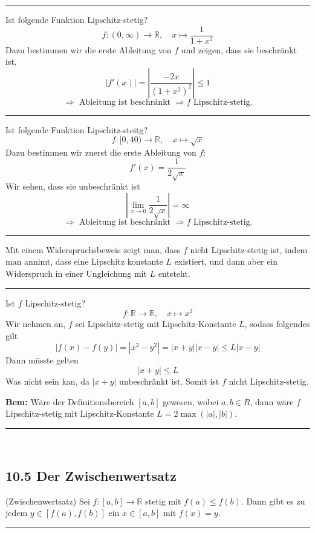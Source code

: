 \documentclass[a4paper,landscape,8pt]{extarticle}
\newcommand{\R}{\mathbb{R}}
\newcommand{\abs}[1]{\left\lvert #1 \right\rvert}
\newcommand{\sep}{\vspace{5pt}\noindent\hrule\vspace{5pt}}
\newcommand{\Bem}{\textbf{Bem: }}
\renewcommand*{\newpage}{ \ }
\begin{document}
\begin{multicols*}{4}
\begin{warmup}
\sep

\Bsp Ist folgende Funktion Lipschitz-stetig?
\[
f\colon(0,\infty) \to \R, \quad x\mapsto \frac{1}{1+x^2}
\]
Dazu bestimmen wir die erste Ableitung von $f$ und zeigen, dass sie
beschränkt ist.
\[
\abs{f'(x)} = \abs{\frac{-2x}{(1+x^2)^2}}
\leq 1
\]
\[
\Longrightarrow \text{ Ableitung ist beschränkt }
\Longrightarrow f \text{ Lipschitz-stetig.}
\]
\sep

\Bsp Ist folgende Funktion Lipschitz-steitg?
\[
f\colon [0,40)\to\R, \quad x\mapsto \sqrt{x}
\]
Dazu bestimmen wir zuerst die erste Ableitung von $f$:
\[
f'(x) = \frac{1}{2\sqrt{x}}
\]
Wir sehen, dass sie unbeschränkt ist
\[
\abs{\lim_{x\to 0} \frac{1}{2\sqrt{x}}} = \infty 
\]
\[
\Longrightarrow \text{ Ableitung ist beschränkt }
\Longrightarrow f \text{ Lipschitz-stetig.}
\]

\sep

\end{warmup}

\Vorgehen Mit einem Widerspruchsbeweis zeigt man, dass $f$ nicht
Lipschitz-stetig ist, indem man annimt, dass eine Lipschitz konstante $L$
existiert, und dann aber ein Widerspruch in einer Ungleichung mit $L$ entsteht.

\begin{warmup}
\sep

\Bsp Ist $f$ Lipschitz-stetig?
\[
f\colon \R \to \R,\quad x\mapsto x^2
\]
Wir nehmen an, $f$ sei Lipschitz-stetig mit Lipschitz-Konstante $L$, sodass
folgendes gilt
\[
\abs{f(x)-f(y)} = \abs{x^2-y^2}
=\abs{x+y}\abs{x-y}
\leq
L\abs{x-y}
\]
Dann müsste gelten
\[
\abs{x+y}\leq L
\]
Was nicht sein kan, da $\abs{x+y}$ unbeschränkt ist. Somit ist $f$ nicht
Lipschitz-stetig.

\Bem Wäre der Definitionsbereich $[a,b]$ gewesen, wobei $a,b\in R$, dann wäre
$f$ Lipschitz-stetig mit Lipschitz-Konstante $L=2\max(\abs{a},\abs{b})$.

\sep
\end{warmup}

\newpage

\subsection{10.5 Der Zwischenwertsatz}

\Satz (Zwischenwertsatz) Sei $f\colon[a,b]\to\R$ stetig mit $f(a)\leq f(b)$.
Dann gibt es zu jedem $y\in[f(a),f(b)]$ ein $x\in [a,b]$ mit $f(x)=y$.

\sep


\end{multicols*}
\end{document}
